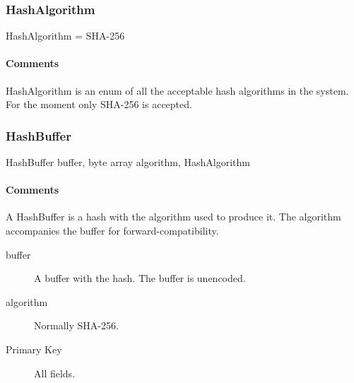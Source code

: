 \documentclass[a4paper,10pt]{article}
\begin{document}
\subsubsection{HashAlgorithm}

\begin{verbbox}
HashAlgorithm = { SHA-256 }
\end{verbbox}
\begin{center}
\theverbbox
\end{center}

\begin{inparaitem}[ ]
 \item \infrastructure
\end{inparaitem}

\paragraph*{Comments}
HashAlgorithm is an enum of all the acceptable hash algorithms in the system. For the moment only SHA-256 is accepted.

\subsubsection{HashBuffer}

\begin{verbbox}
HashBuffer
{
  buffer, byte array
  algorithm, HashAlgorithm
}
\end{verbbox}
\begin{center}
\theverbbox
\end{center}

\begin{inparaitem}[ ]
 \item \infrastructure
\end{inparaitem}

\paragraph*{Comments}
A HashBuffer is a hash with the algorithm used to produce it. The algorithm accompanies the buffer for forward-compatibility.

\SpecialItem
\begin{description}
 \item[buffer] A buffer with the hash. The buffer is unencoded.
 \item[algorithm] Normally SHA-256.
\end{description}

\SpecialItem
\begin{description}
 \item[Primary Key] All fields.
\end{description}
\end{document}
